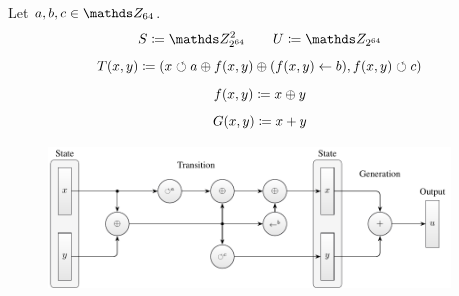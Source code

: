 \documentclass{stdlocal}
\begin{document}

    \begin{definition}[Xoroshiro128+]
      Let $a,b,c \in \setInteger_{64}$.
      \[
        S \define \setInteger_{2^{64}}^2
        \separate
        U \define \setInteger_{2^{64}}
      \]
      \[
        T(x,y) \coloneqq (x \circlearrowleft a \oplus f(x,y) \oplus (f(x,y) \leftarrow b), f(x,y) \circlearrowleft c)
      \]
      \[
        f(x,y) \coloneqq x \oplus y
      \]
      \[
        G(x,y) \coloneqq x + y
      \]
    \end{definition}
    \begin{figure}
      \center
      \includegraphics[width=0.95\textwidth]{figures/xrsr128p_scheme.pdf}
      \caption[Xoroshiro128+ Scheme]{}
      \label{fig:xoroshiro-scheme}
    \end{figure}
\end{document}
